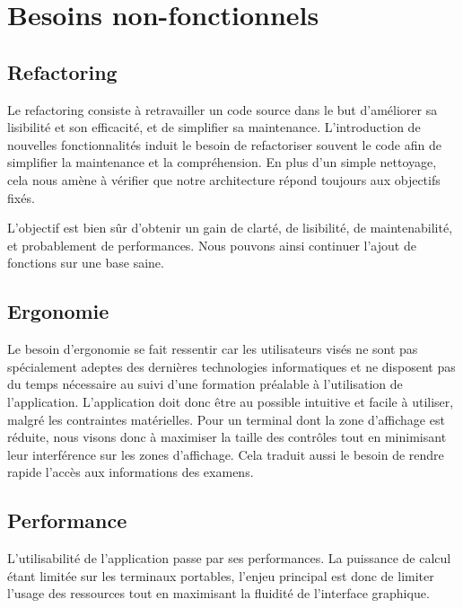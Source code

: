 \section{Besoins non-fonctionnels}

\subsection{Refactoring}

Le refactoring consiste à retravailler un code source dans le but d'améliorer sa lisibilité et son efficacité, et de simplifier sa maintenance.
L'introduction de nouvelles fonctionnalités induit le besoin de refactoriser souvent le code afin de simplifier
la maintenance et la compréhension.
En plus d'un simple nettoyage, cela nous amène à vérifier que notre architecture répond toujours aux
objectifs fixés.

L'objectif est bien sûr d'obtenir un gain de clarté, de lisibilité, de maintenabilité, et probablement de performances. Nous pouvons ainsi continuer l'ajout de fonctions sur une base saine.

\subsection{Ergonomie}

Le besoin d'ergonomie se fait ressentir car les utilisateurs visés ne sont pas spécialement adeptes des dernières technologies informatiques et ne disposent pas du temps nécessaire au suivi d'une formation préalable à l'utilisation de l'application. L'application doit donc être au possible intuitive et facile à utiliser, malgré les contraintes matérielles. Pour un terminal dont la zone d'affichage est réduite, nous visons donc à maximiser la taille des contrôles tout en minimisant leur interférence sur les zones d'affichage. Cela traduit aussi le besoin de rendre rapide l'accès aux informations des examens.

\subsection{Performance}

L'utilisabilité de l'application passe par ses performances. La puissance de calcul étant limitée sur les terminaux portables, l'enjeu principal est donc de limiter l'usage des ressources tout en maximisant la fluidité de l'interface graphique.
